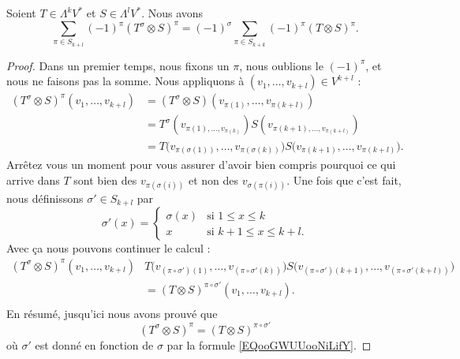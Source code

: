 \begin{lemma}		\label{LEMooERYDooAifUdG}
	Soient \( T\in \Lambda^kV^*\) et \( S\in \Lambda^lV^*\). Nous avons
	\begin{equation}
		\sum_{\pi\in S_{k+l}}(-1)^{\pi}(T^{\sigma}\otimes S)^{\pi}=(-1)^{\sigma}\sum_{\pi\in S_{k+k}}(-1)^{\pi}(T\otimes S)^{\pi}.
	\end{equation}
\end{lemma}

\begin{proof}
	Dans un premier temps, nous fixons un \( \pi\), nous oublions le \( (-1)^{\pi}\), et nous ne faisons pas la somme. Nous appliquons à \( (v_1,\ldots,v_{k+l})\in V^{k+l}\) :
	\begin{subequations}
		\begin{align}
			(T^{\sigma}\otimes S)^{\pi}(v_1,\ldots,v_{k+l}) & =(T^{\sigma}\otimes S)(v_{\pi(1)},\ldots, v_{\pi(k+l)})                                                  \\
			                                                & =T^{\sigma}(v_{\pi(1),\ldots,v_{\pi(k)}})S(v_{\pi(k+1),\ldots,v_{\pi(k+l)}})                             \\
			                                                & =T\big( v_{\pi(\sigma(1))},\ldots,v_{\pi(\sigma(k))} \big)S\big( v_{\pi(k+1)},\ldots,v_{\pi(k+l)} \big).
		\end{align}
	\end{subequations}
	Arrêtez vous un moment pour vous assurer d'avoir bien compris pourquoi ce qui arrive dans \( T\) sont bien des \( v_{\pi(\sigma(i))}\) et non des \( v_{\sigma(\pi(i))}\). Une fois que c'est fait, nous définissons \( \sigma'\in S_{k+l}\) par
	\begin{equation}		\label{EQooGWUUooNiLifY}
		\sigma'(x)=\begin{cases}
			\sigma(x) & \text{si } 1\leq x\leq k     \\
			x         & \text{si }k+1\leq x\leq k+l.
		\end{cases}
	\end{equation}
	Avec ça nous pouvons continuer le calcul :
	\begin{subequations}
		\begin{align}
			(T^{\sigma}\otimes S)^{\pi}(v_1,\ldots,v_{k+l}) & T\big( v_{(\pi\circ\sigma')(1)},\ldots,v_{(\pi\circ \sigma'(k))} \big)S\big( v_{(\pi\circ \sigma')(k+1)},\ldots,v_{(\pi\circ\sigma'(k+l))} \big) \\
			                                                & =(T\otimes S)^{\pi\circ\sigma'}(v_1,\ldots,v_{k+l}).                                                                                             \\
		\end{align}
	\end{subequations}
	En résumé, jusqu'ici nous avons prouvé que
	\begin{equation}
		(T^{\sigma}\otimes S)^{\pi}=(T\otimes S)^{\pi\circ \sigma'}
	\end{equation}
	où \( \sigma'\) est donné en fonction de \( \sigma\) par la formule \eqref{EQooGWUUooNiLifY}.


\end{proof}
